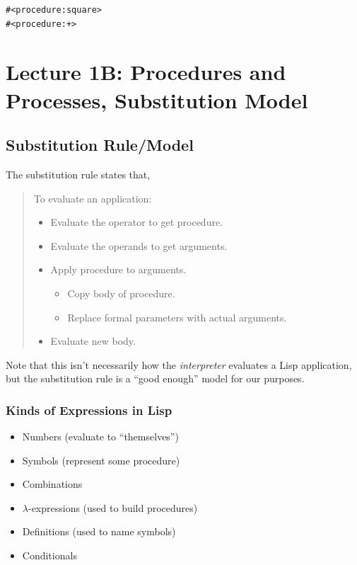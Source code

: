 \documentclass[9pt]{report}
\begin{document}
\begin{verbatim}
#<procedure:square>
#<procedure:+>
\end{verbatim}

\chapter{Lecture 1B: Procedures and Processes, Substitution Model}
\label{sec:org7f91f03}

\section{Substitution Rule/Model}
\label{sec:orgddede05}
The substitution rule states that,

\begin{quote}
To evaluate an application:
\begin{itemize}
\item Evaluate the operator to get procedure.
\item Evaluate the operands to get arguments.
\item Apply procedure to arguments.
\begin{itemize}
\item Copy body of procedure.
\item Replace formal parameters with actual arguments.
\end{itemize}
\item Evaluate new body.
\end{itemize}
\end{quote}

Note that this isn't necessarily how the \emph{interpreter} evaluates a
Lisp application, but the substitution rule is a ``good enough''
model for our purposes.

\subsection{Kinds of Expressions in Lisp}
\label{sec:orgd755f65}
\begin{itemize}
\item Numbers (evaluate to ``themselves'')
\item Symbols (represent some procedure)
\item Combinations
\item \(\lambda\)-expressions (used to build procedures)
\item Definitions (used to name symbols)
\item Conditionals
\end{itemize}
\end{document}
